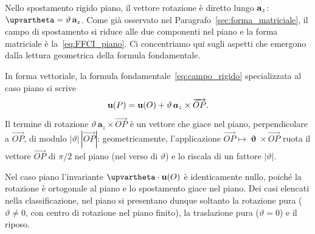 Nello spostamento rigido piano, il vettore rotazione è 	diretto lungo $\mathbf{a}_z$: 	$\bm{\upvartheta} = \vartheta\,\ab_z$. Come già 
osservato nel Paragrafo~\ref{sec:forma_matriciale}, il campo di spostamento si riduce alle due componenti nel piano e la forma matriciale è la~\eqref{eq:FFCI_piano}. Ci concentriamo qui 	sugli aspetti che emergono dalla lettura geometrica della formula fondamentale.




In forma vettoriale, la formula fondamentale~\eqref{eq:campo_rigido}
specializzata al caso piano si scrive
\begin{equation}\label{eq:FFCI_piano_vett}
	\mathbf{u}(P) = \mathbf{u}(O) +\vartheta\, \bm{a}_z \times \overrightarrow{OP}.
\end{equation}
Il termine di rotazione
$\vartheta\, \bm{a}_z\times \overrightarrow{OP}$ è un vettore che
giace nel piano, perpendicolare a $\overrightarrow{OP}$, di
modulo $|\vartheta|\,|\overrightarrow{OP}|$: geometricamente,
l'applicazione
$\overrightarrow{OP} \mapsto \bm{\upvartheta} \times
\overrightarrow{OP}$ ruota il vettore $\overrightarrow{OP}$ di
$\pi/2$ nel piano (nel verso di $\vartheta$) e lo riscala di un
fattore $|\vartheta|$.


\begin{oss}
	Nel caso piano l'invariante
	$\bm{\upvartheta} \cdot \ub(O)$ è identicamente nullo,	poiché la rotazione è ortogonale al piano e lo spostamento
	giace nel piano. Dei casi elencati nella classificazione, nel piano si presentano dunque soltanto la rotazione pura	($\vartheta \neq 0$, con centro di rotazione nel piano	finito), la traslazione pura ($\vartheta = 0$) e il riposo.
\end{oss}

\bigskip

